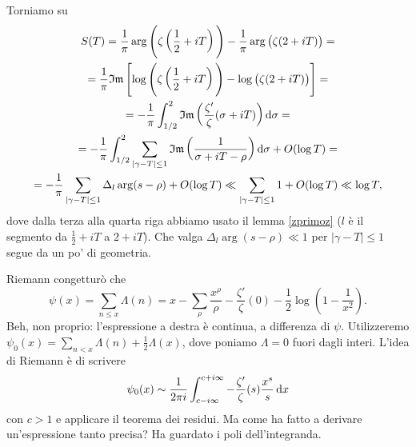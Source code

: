 Torniamo su
\begin{gather*}
  S(T)=\frac{1}{\pi}\arg\Bigg(\zeta\left(\frac{1}{2}+iT\right)\Bigg)-\frac{1}{\pi}\arg\big(\zeta(2+iT)\big)= \\
  =\frac{1}{\pi}\mathfrak{Im}\left[\log\Bigg(\zeta\left(\frac{1}{2}+iT\right)\Bigg)-\log\big(\zeta(2+iT)\big)\right]= \\
  =-\frac{1}{\pi}\int_{1/2}^2 \mathfrak{Im}\left(\frac{\zeta'}{\zeta}(\sigma+iT)\right)\mathop{}\!\mathrm{d}\sigma= \\
  =-\frac{1}{\pi}\int_{1/2}^2 \sum_{|\gamma-T| \le 1} \mathfrak{Im}\left(\frac{1}{\sigma+iT-\rho}\right)\mathop{}\!\mathrm{d}\sigma+O(\log{T})= \\
  =-\frac{1}{\pi}\sum_{|\gamma-T| \le 1} \Delta_l\arg(s-\rho) +O(\log{T}) \ll \sum_{|\gamma-T| \le 1} 1 +O(\log{T}) \ll \log{T},
\end{gather*}
dove dalla terza alla quarta riga abbiamo usato il lemma \ref{zprimoz} ($l$ è il segmento da $\frac{1}{2}+iT$ a $2+iT$). Che valga $\Delta_l\arg(s-\rho) \ll 1$ per $|\gamma-T| \le 1$ segue da un po' di geometria.

Riemann congetturò che
$$\psi(x)=\sum_{n \le x} \Lambda(n)=x-\sum_{\rho} \frac{x^{\rho}}{\rho}-\frac{\zeta'}{\zeta}(0)-\frac{1}{2}\log\left(1-\frac{1}{x^2}\right).$$
Beh, non proprio: l'espressione a destra è continua, a differenza di $\psi$. Utilizzeremo $\psi_0(x)=\displaystyle \sum_{n<x} \Lambda(n)+\frac{1}{2}\Lambda(x)$, dove poniamo $\Lambda=0$ fuori dagli interi. L'idea di Riemann è di scrivere
$$\psi_0(x) \sim \frac{1}{2\pi i} \int_{c-i\infty}^{c+i\infty} -\frac{\zeta'}{\zeta}(s)\frac{x^s}{s}\mathop{}\!\mathrm{d} x$$
con $c>1$ e applicare il teorema dei residui. Ma come ha fatto a derivare un'espressione tanto precisa? Ha guardato i poli dell'integranda.
